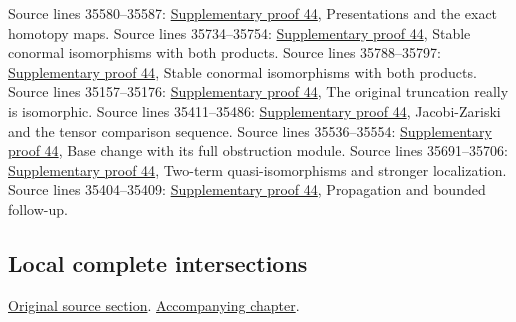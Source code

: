 \begin{AlgebraSourceRoutes}
 Source lines 35580--35587: \hyperlink{algebra_naive_cotangent_notes_20260928}{Supplementary proof 44}, Presentations and the exact homotopy maps.
 Source lines 35734--35754: \hyperlink{algebra_naive_cotangent_notes_20260928}{Supplementary proof 44}, Stable conormal isomorphisms with both products.
 Source lines 35788--35797: \hyperlink{algebra_naive_cotangent_notes_20260928}{Supplementary proof 44}, Stable conormal isomorphisms with both products.
 Source lines 35157--35176: \hyperlink{algebra_naive_cotangent_notes_20260928}{Supplementary proof 44}, The original truncation really is isomorphic.
 Source lines 35411--35486: \hyperlink{algebra_naive_cotangent_notes_20260928}{Supplementary proof 44}, Jacobi-Zariski and the tensor comparison sequence.
 Source lines 35536--35554: \hyperlink{algebra_naive_cotangent_notes_20260928}{Supplementary proof 44}, Base change with its full obstruction module.
 Source lines 35691--35706: \hyperlink{algebra_naive_cotangent_notes_20260928}{Supplementary proof 44}, Two-term quasi-isomorphisms and stronger localization.
 Source lines 35404--35409: \hyperlink{algebra_naive_cotangent_notes_20260928}{Supplementary proof 44}, Propagation and bounded follow-up.
\end{AlgebraSourceRoutes}

\subsection{Local complete intersections}
\hypertarget{algebra-source-section-lci}{}
\noindent\href{https://github.com/stacks/stacks-project/blob/a04446e57ec1fbc252a871afcec7752fb2807b14/algebra.tex\#L35805}{Original source section}. \href{algebra.pdf\#nameddest=section-lci}{Accompanying chapter}.

